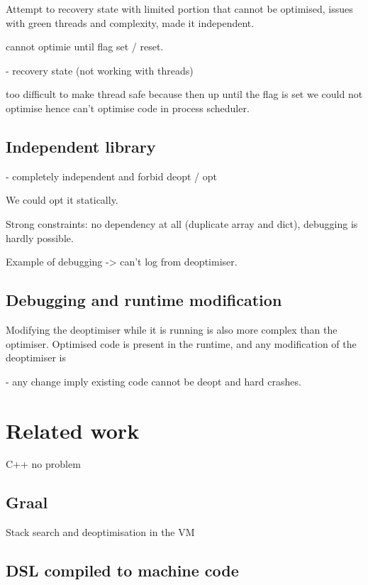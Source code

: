 \documentclass[a4paper,12pt,twoside]{../includes/ThesisStyle}
\begin{document}
 Attempt to recovery state with limited portion that cannot be optimised, issues with green threads and complexity, made it independent.

cannot optimie until flag set / reset.

- recovery state (not working with threads)

too difficult to make thread safe because then up until the flag is set we could not optimise hence can't optimise code in process scheduler.

\subsection{Independent library}

- completely independent and forbid deopt / opt

We could opt it statically.

Strong constraints: no dependency at all (duplicate array and dict), debugging is hardly possible.

Example of debugging -> can't log from deoptimiser. 

\subsection{Debugging and runtime modification}

Modifying the deoptimiser while it is running is also more complex than the optimiser. Optimised code is present in the runtime, and any modification of the deoptimiser is

- any change imply existing code cannot be deopt and hard crashes.


\section{Related work}

 C++ no problem

\subsection{Graal}

Stack search and deoptimisation in the VM

\subsection{DSL compiled to machine code}
\end{document}
